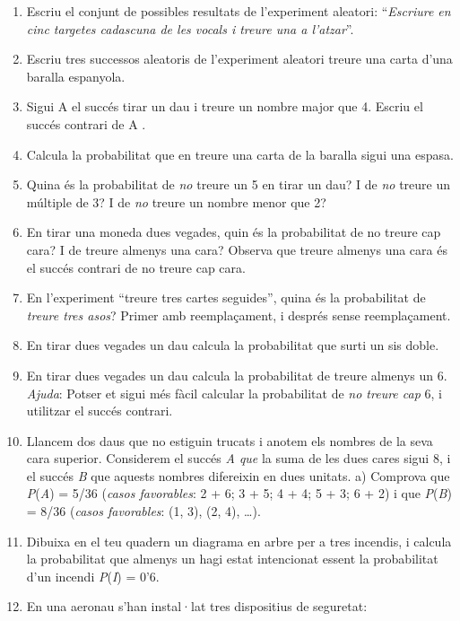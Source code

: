 \begin{enumerate}
\def\labelenumi{\arabic{enumi}.}
\tightlist
\item
  Escriu el conjunt de possibles resultats de l'experiment aleatori:
  ``\emph{Escriure en cinc targetes cadascuna de les vocals i treure una
  a l'atzar}''.
\item
  Escriu tres successos aleatoris de l'experiment aleatori treure una
  carta d'una baralla espanyola. 
\item
  Sigui A el succés tirar un dau i treure un nombre major que 4. Escriu
  el succés contrari de A .
\item
  Calcula la probabilitat que en treure una carta de la baralla sigui
  una espasa.
\item
  Quina és la probabilitat de \emph{no} treure un 5 en tirar un dau? I
  de \emph{no} treure un múltiple de 3? I de \emph{no} treure un nombre
  menor que 2? 
\item
  En tirar una moneda dues vegades, quin és la probabilitat de no treure
  cap cara? I de treure almenys una cara? Observa que treure almenys una
  cara és el succés contrari de no treure cap cara.
\item
  En l'experiment ``treure tres cartes seguides'', quina és la
  probabilitat de \emph{treure tres asos}? Primer amb reemplaçament, i
  després sense reemplaçament.
\item
  En tirar dues vegades un dau calcula la probabilitat que surti un sis
  doble. 
\item
  En tirar dues vegades un dau calcula la probabilitat de treure almenys
  un 6. \emph{Ajuda}: Potser et sigui més fàcil calcular la probabilitat
  de \emph{no treure cap} 6, i utilitzar el succés contrari.
\item
  Llancem dos daus que no estiguin trucats i anotem els nombres de la
  seva cara superior. Considerem el succés \emph{A que} la suma de les
  dues cares sigui 8, i el succés \emph{B} que aquests nombres
  difereixin en dues unitats. a) Comprova que \emph{P}(\emph{A}) = 5/36
  (\emph{casos favorables}: 2 + 6; 3 + 5; 4 + 4; 5 + 3; 6 + 2) i que
  \emph{P}(\emph{B}) = 8/36 (\emph{casos favorables}: (1, 3), (2, 4),
  \ldots{}). 
\item
  Dibuixa en el teu quadern un diagrama en arbre per a tres incendis, i
  calcula la probabilitat que almenys un hagi estat intencionat essent
  la probabilitat d'un incendi \emph{P}(\emph{I}) = 0'6.
\item
  En una aeronau s'han instal·lat tres dispositius de seguretat:

\end{enumerate}
